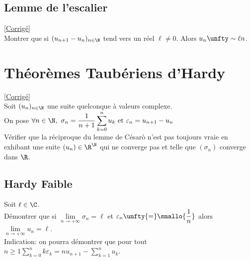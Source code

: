 \documentclass{book}
\begin{document}
	\subsection{Lemme de l'escalier }
	\textcolor{blue}{\hyperref[Lemme de l'escalier corrigé]{[Corrigé]}}\\
	\label{Lemme de l'escaclier}
	Montrer que si $(u_{n+1}-u_n)_{n\in \N}$ tend vers un réel $\ell\ne 0$. Alors $u_n\unfty\sim\ell n$.
	
	\section{Théorèmes Taubériens d'Hardy }
	\textcolor{blue}{\hyperref[Théorèmes Taubériens d'Hardy corrigé]{[Corrigé]}}\\
	\label{Théorèmes Taubériens d'Hardy}
	Soit $(u_n)_{n\in \N}$ une suite quelconque à valeurs complexe.
	\\On pose $\forall n \in \N,\ \sigma_n=\displaystyle\frac{1}{n+1}\displaystyle\sum\limits_{k=0}^nu_k \ \text{et}\ \varepsilon_n=u_{n+1}-u_n$
	\\Vérifier que la réciproque du lemme de Césarò n'est pas toujours vraie en exhibant une suite $(u_n) \in\R^\N$ qui ne converge pas et telle que $(\sigma_n)$ converge dans $\R$.
	
	\subsection{Hardy Faible }
	Soit $\ell\in\C$.
	\\Démontrer que si $\lim\limits_{n\to+\infty} \sigma_n=\ell$ et $\varepsilon_n\unfty{=}\smallo{\displaystyle\frac{1}{n}}$ alors $\lim\limits_{n\to+\infty} u_n=\ell$.
	\\Indication: on pourra démontrer que pour tout $n\geq 1 \displaystyle\sum\limits_{k=0}^n k\varepsilon_k=nu_{n+1}-\sum\limits_{k=1}^nu_k$.
	
\end{document}
